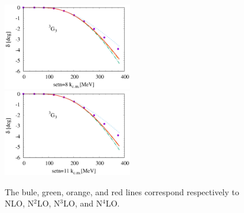 \documentclass{article}
\begin{document}
\begin{figure}[htbp]
\includegraphics[width=0.5\textwidth]{8_3g3.eps}
\includegraphics[width=0.5\textwidth]{11_3g3.eps}
\caption{The bule, green, orange, and red lines correspond respectively to NLO, N$^2$LO, N$^3$LO, and N$^4$LO. }
\end{figure}
\end{document}
